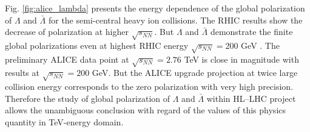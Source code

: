 Fig. \ref{fig:alice_lambda} presents the energy dependence of the global polarization of $\Lambda$ and $\bar{\Lambda}$ for the semi-central heavy ion collisions. The RHIC results show the decrease of polarization at higher $\sqrt{s_{NN}}$. But $\Lambda$ and $\bar{\Lambda}$ demonstrate the finite global polarizations even at highest RHIC energy $\sqrt{s_{NN}}=200$ GeV \cite{PRC-98-014910-2018}. The preliminary ALICE data point at $\sqrt{s_{NN}}=2.76$ TeV is close in magnitude with results at $\sqrt{s_{NN}}=200$ GeV. But the ALICE upgrade projection at twice large collision energy corresponds to the zero polarization with very high precision. Therefore the study of global polarization of $\Lambda$ and $\bar{\Lambda}$ within HL--LHC project allows the unambiguous conclusion with regard of the values of this physics quantity in TeV-energy domain.    
